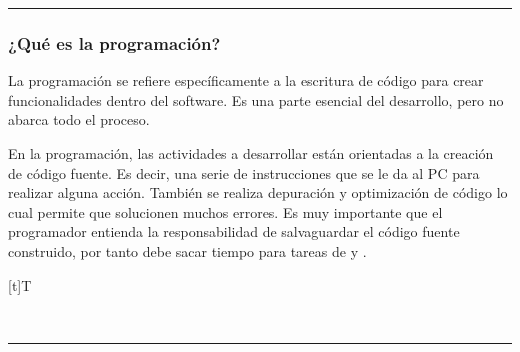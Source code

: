 \documentclass[letterpaper,10pt,spanish]{sphinxmanual}
\let\sphinxpxdimen\pdfpxdimen\else\newdimen\sphinxpxdimen
\begin{document}
\bigskip\hrule\bigskip



\subsubsection{¿Qué es la programación?}
\label{\detokenize{1_guias/10programacion/G1021:que-es-la-programacion}}
\sphinxAtStartPar
La programación se refiere específicamente a la escritura de código para crear funcionalidades dentro del software. Es una parte esencial del desarrollo, pero no abarca todo el proceso.

\sphinxAtStartPar
En la programación, las actividades a desarrollar están orientadas a la creación de código fuente. Es decir, una serie de instrucciones que se le da al PC para realizar alguna acción. También se realiza depuración y optimización de código lo cual permite que solucionen muchos errores. Es muy importante que el programador entienda la responsabilidad de salvaguardar el código fuente construido, por tanto debe sacar tiempo para tareas de  y .


\begin{savenotes}\sphinxattablestart
\sphinxthistablewithglobalstyle
\centering
\begin{tabulary}{\linewidth}[t]{T}
\sphinxtoprule
\sphinxtableatstartofbodyhook

\begin{sphinxfigure-in-table}
\centering
\capstart
\noindent\sphinxincludegraphics[width=360\sphinxpxdimen]{{image019}.png}
\label{\detokenize{1_guias/10programacion/G1021:id1}}\end{sphinxfigure-in-table}\relax
\\
\sphinxbottomrule
\end{tabulary}
\sphinxtableafterendhook\par
\sphinxattableend\end{savenotes}


\bigskip\hrule\bigskip
\end{document}
